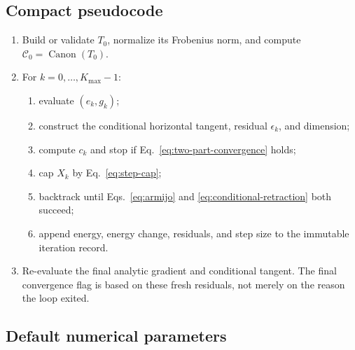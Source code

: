 \documentclass[11pt]{article}
\begin{document}
\subsection{Compact pseudocode}

\begin{enumerate}
  \item Build or validate $T_0$, normalize its Frobenius norm, and compute
        $\mathcal C_0=\operatorname{Canon}(T_0)$.
  \item For $k=0,\ldots,K_{\max}-1$:
    \begin{enumerate}
      \item evaluate $(e_k,g_k)$;
      \item construct the conditional horizontal tangent, residual
            $\epsilon_k$, and dimension;
      \item compute $c_k$ and stop if Eq.~\eqref{eq:two-part-convergence}
            holds;
      \item cap $X_k$ by Eq.~\eqref{eq:step-cap};
      \item backtrack until Eqs.~\eqref{eq:armijo} and
            \eqref{eq:conditional-retraction} both succeed;
      \item append energy, energy change, residuals, and step size to the
            immutable iteration record.
    \end{enumerate}
  \item Re-evaluate the final analytic gradient and conditional tangent.
        The final convergence flag is based on these fresh residuals, not
        merely on the reason the loop exited.
\end{enumerate}

\subsection{Default numerical parameters}
\end{document}
